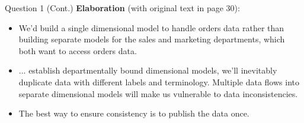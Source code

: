 \begin{frame}[fragile]{Question 1 (Cont.)}
\textbf{Elaboration} (with original text in page 30):\\
\begin{itemize}
	\item We'd build a single dimensional model to handle orders
	data rather than building separate models for the sales and marketing
	departments, which both want to access orders data.
	\item ... establish departmentally bound dimensional models, we’ll inevitably
	duplicate data with different labels and terminology. 
	Multiple data flows
	into separate dimensional models will make us vulnerable to data inconsistencies.
	\item The best way to ensure consistency is to publish the data once.
\end{itemize}
\end{frame}

